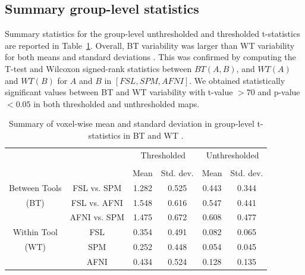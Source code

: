 \documentclass[conference]{IEEEtran}
\begin{document}
\subsection{Summary group-level statistics}

Summary statistics for the group-level unthresholded and thresholded
t-statistics are reported in Table~\ref{table:pipeline-stats}.
 Overall, BT
variability was larger than WT variability for both means and standard
deviations . This was
confirmed by computing the T-test and Wilcoxon signed-rank statistics
between $BT(A, B)$, and $WT(A)$ and $WT(B)$ for $A$ and $B$ in $[FSL, SPM,
AFNI]$. We obtained statistically significant values between BT and WT
variability with t-value $> 70$ and p-value $< 0.05$ in both thresholded
and unthresholded maps.

\setlength{\tabcolsep}{5pt}
\begin{table}[h]
    \centering
    \begin{tabular}{cccc|cc}
        \toprule
        \multirow{2}{*}{}& {} & \multicolumn{2}{c}{Thresholded} & \multicolumn{2}{c}{Unthresholded} \\
        \cmidrule{3-4} \cmidrule{5-6} \\
        {} & {} & Mean & Std. dev. & Mean & Std. dev. \\
        \midrule
        \rowcolor{lightgray}
        {Between Tools} & FSL vs. SPM        &  1.282       & 0.525      & 0.443     & 0.344  \\
        \rowcolor{lightgray}
        {(BT)} & FSL vs. AFNI                &  1.548       & 0.616      & 0.547     & 0.441  \\
        \rowcolor{lightgray}
        {} & AFNI vs. SPM                    &  1.475       & 0.672      & 0.608     & 0.477  \\
        {Within Tool} & FSL                  &  0.354       & 0.491      & 0.082     & 0.065  \\
        {(WT)}   & SPM                       &  0.252       & 0.448      & 0.054     & 0.045  \\
        {}   & AFNI                          &  0.434       & 0.524      & 0.128     & 0.135  \\
        \bottomrule
    \end{tabular}
    \caption{Summary of voxel-wise mean and standard deviation in
    group-level t-statistics in BT and WT .}
    \label{table:pipeline-stats}
\end{table}
\end{document}
